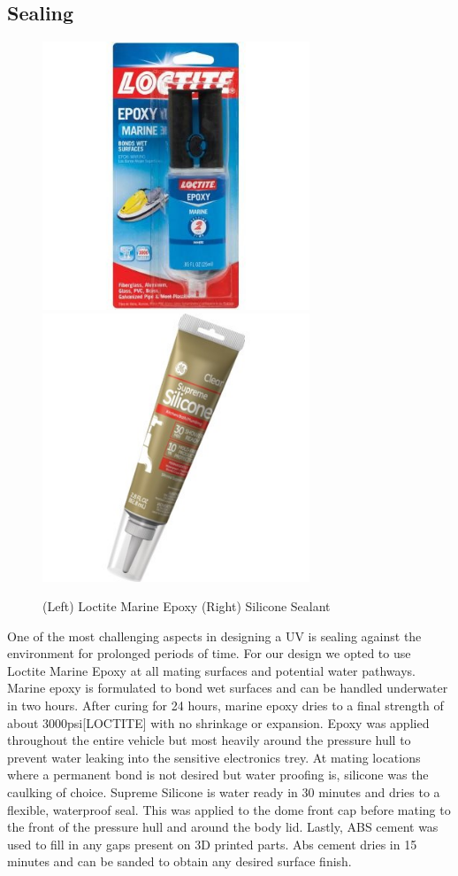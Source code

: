 \documentclass{report}
\begin{document}
\subsection{Sealing}
\begin{figure}[H]
\centering
\includegraphics[width=8cm]{"loctite"}
\includegraphics[width=8cm]{"silicon"}
\caption{(Left) Loctite Marine Epoxy (Right) Silicone Sealant}
\end{figure}
One of the most challenging aspects in designing a UV is sealing against the environment for prolonged periods of time.  For our design we opted to use Loctite Marine Epoxy at all mating surfaces and potential water pathways.  Marine epoxy is formulated to bond wet surfaces and can be handled underwater in two hours.  After curing for 24 hours, marine epoxy dries to a final strength of about 3000psi[LOCTITE] with no shrinkage or expansion. Epoxy was applied throughout the entire vehicle but most heavily around the pressure hull to prevent water leaking into the sensitive electronics trey.  At mating locations where a permanent bond is not desired but water proofing is, silicone was the caulking of choice.  Supreme Silicone is water ready in 30 minutes and dries to a flexible, waterproof seal.  This was applied to the dome front cap before mating to the front of the pressure hull and around the body lid.  Lastly, ABS cement was used to fill in any gaps present on 3D printed parts.  Abs cement dries in 15 minutes and can be sanded to obtain any desired surface finish.
\end{document}

